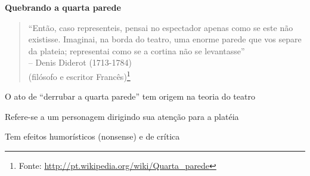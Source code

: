 \expandafter\documentclass\expandafter[table, usenames, svgnames, dvipsnames, \classopts]{beamer}
\begin{document}
\begin{frame}{\textbf{Quebrando a quarta parede}}

	\begin{quotation}
		\noindent
		``Então, caso representeis, pensai no espectador apenas como se este não existisse. Imaginai, na borda do teatro, uma enorme parede que vos separe da plateia; representai como se a cortina não se levantasse''\\
		\hfill -- Denis Diderot (1713-1784)\\
		\hfill (filósofo e escritor Francês)\footnote{Fonte: \url{http://pt.wikipedia.org/wiki/Quarta_parede}}
	\end{quotation}
	
	\vspace{1em}

	\begin{outline}
		\1 O ato de ``derrubar a quarta parede'' tem origem na teoria do teatro
		
		\1 Refere-se a um personagem dirigindo sua atenção para a platéia
			
		\1 Tem efeitos humorísticos (nonsense) e de crítica
	\end{outline}

\end{frame}
\end{document}
